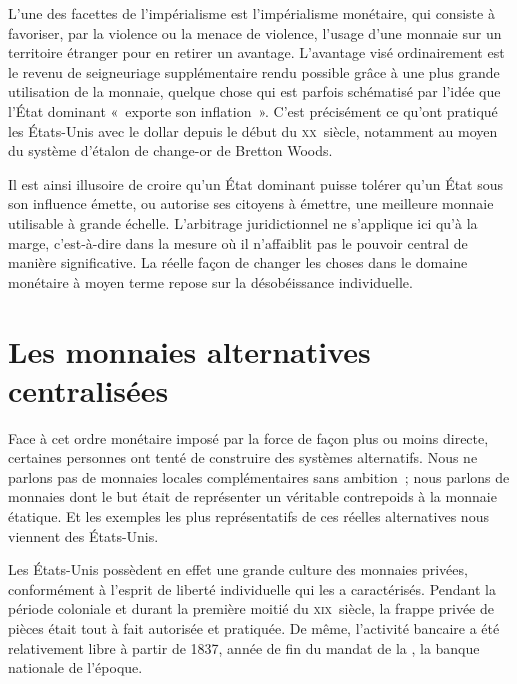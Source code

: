 L'une des facettes de l'impérialisme est l'impérialisme monétaire, qui consiste à favoriser, par la violence ou la menace de violence, l'usage d'une monnaie sur un territoire étranger pour en retirer un avantage. L'avantage visé ordinairement est le revenu de seigneuriage supplémentaire rendu possible grâce à une plus grande utilisation de la monnaie, quelque chose qui est parfois schématisé par l'idée que l'État dominant «~exporte son inflation~». C'est précisément ce qu'ont pratiqué les États-Unis avec le dollar depuis le début du \textsc{xx}\ieme{}~siècle, notamment au moyen du système d'étalon de change-or de Bretton Woods. %

Il est ainsi illusoire de croire qu'un État dominant puisse tolérer qu'un État sous son influence émette, ou autorise ses citoyens à émettre, une meilleure monnaie utilisable à grande échelle. L'arbitrage juridictionnel ne s'applique ici qu'à la marge, c'est-à-dire dans la mesure où il n'affaiblit pas le pouvoir central de manière significative. La réelle façon de changer les choses dans le domaine monétaire à moyen terme repose sur la désobéissance individuelle.

\section*{Les monnaies alternatives centralisées}

Face à cet ordre monétaire imposé par la force de façon plus ou moins directe, certaines personnes ont tenté de construire des systèmes alternatifs. Nous ne parlons pas de monnaies locales complémentaires sans ambition~; nous parlons de monnaies dont le but était de représenter un véritable contrepoids à la monnaie étatique. Et les exemples les plus représentatifs de ces réelles alternatives nous viennent des États-Unis.

Les États-Unis possèdent en effet une grande culture des monnaies privées, conformément à l'esprit de liberté individuelle qui les a caractérisés. Pendant la période coloniale et durant la première moitié du \textsc{xix}\ieme{}~siècle, la frappe privée de pièces était tout à fait autorisée et pratiquée. De même, l'activité bancaire a été relativement libre à partir de 1837, année de fin du mandat de la , la banque nationale de l'époque.

